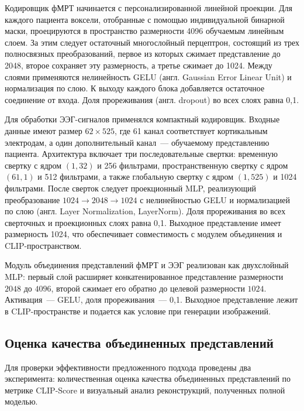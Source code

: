 Кодировщик фМРТ начинается с персонализированной линейной проекции. Для каждого пациента воксели, отобранные с помощью индивидуальной бинарной маски, проецируются в пространство размерности 4096 обучаемым линейным слоем. За этим следует остаточный многослойный перцептрон, состоящий из трех полносвязных преобразований, первое из которых сжимает представление до 2048, второе сохраняет эту размерность, а третье сжимает до 1024. Между слоями применяются нелинейность GELU (англ. Gaussian Error Linear Unit) и нормализация по слою. К выходу каждого блока добавляется остаточное соединение от входа. Доля прореживания (англ. dropout) во всех слоях равна 0{,}1.

Для обработки ЭЭГ-сигналов применялся компактный кодировщик. Входные данные имеют размер $62 \times 525$, где 61 канал соответствует кортикальным электродам, а один дополнительный канал~--- обучаемому представлению пациента. Архитектура включает три последовательные свертки: временную свертку с ядром $(1, 32)$ и 256 фильтрами, пространственную свертку с ядром $(61, 1)$ и 512 фильтрами, а также глобальную свертку с ядром $(1, 525)$ и 1024 фильтрами. После сверток следует проекционный MLP, реализующий преобразование $1024 \to 2048 \to 1024$ с нелинейностью GELU и нормализацией по слою (англ. Layer Normalization, LayerNorm). Доля прореживания во всех сверточных и проекционных слоях равна 0{,}1. Выходное представление имеет размерность 1024, что обеспечивает совместимость с модулем объединения и CLIP-пространством.

Модуль объединения представлений фМРТ и ЭЭГ реализован как двухслойный MLP: первый слой расширяет конкатенированное представление размерности $2048$ до $4096$, второй сжимает его обратно до целевой размерности $1024$. Активация~--- GELU, доля прореживания~--- 0{,}1. Выходное представление лежит в CLIP-пространстве и подается как условие при генерации изображений.

\subsection{Оценка качества объединенных представлений}\label{sec4:results}

Для проверки эффективности предложенного подхода проведены два эксперимента: количественная оценка качества объединенных представлений по метрике CLIP-Score и визуальный анализ реконструкций, полученных полной моделью.


